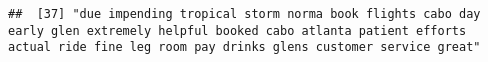 \documentclass[
]{article}
\begin{document}
\begin{verbatim}
##  [37] "due impending tropical storm norma book flights cabo day early glen extremely helpful booked cabo atlanta patient efforts actual ride fine leg room pay drinks glens customer service great"                                                                                                                                                                                                                                                                                                                                                                                                                                                                                                                                                                                                                                                                                                                                                                                                                                                                                                                                                                                                                                                                                                                                                                                                                                                                                                                                                                                                                                                                                                                                                                                                   

\end{verbatim}
\end{document}
